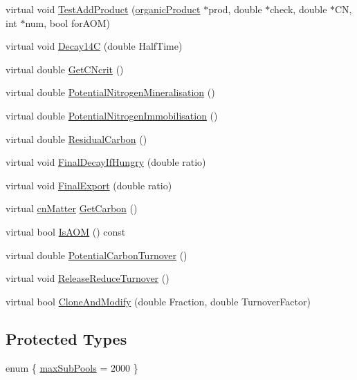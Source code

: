 \begin{DoxyCompactItemize}
virtual void \hyperlink{classadded_matter_a3627f9e81c355df213e783f1ba4a53b2}{TestAddProduct} (\hyperlink{classorganic_product}{organicProduct} $\ast$prod, double $\ast$check, double $\ast$CN, int $\ast$num, bool forAOM)
\item 
virtual void \hyperlink{classadded_matter_ac3f88e4d8ae94d0b7f0fe1b06e33d345}{Decay14C} (double HalfTime)
\item 
virtual double \hyperlink{classadded_matter_ac2d053d776783effa120e93de55c41ea}{GetCNcrit} ()
\item 
virtual double \hyperlink{classadded_matter_a972a4d0ee6fbd8ca8c48be2162c85646}{PotentialNitrogenMineralisation} ()
\item 
virtual double \hyperlink{classadded_matter_a68f5728f82221029360bb31ba2fc1673}{PotentialNitrogenImmobilisation} ()
\item 
virtual double \hyperlink{classadded_matter_a17298527be7046b6035a163e1f558f84}{ResidualCarbon} ()
\item 
virtual void \hyperlink{classadded_matter_a40c4a27c09387b87f804e1c3a48cf908}{FinalDecayIfHungry} (double ratio)
\item 
virtual void \hyperlink{classadded_matter_a6c6bab5a53ecb7358459d44d29681c95}{FinalExport} (double ratio)
\item 
virtual \hyperlink{classcn_matter}{cnMatter} \hyperlink{classadded_matter_aa0c64a25840e1a117b686bb779403147}{GetCarbon} ()
\item 
virtual bool \hyperlink{classadded_matter_a124a49cad0765fff9147d7cb3e3f768e}{IsAOM} () const 
\item 
virtual double \hyperlink{classadded_matter_ac3cf951aba3e5001b9e7d582084863bf}{PotentialCarbonTurnover} ()
\item 
virtual void \hyperlink{classadded_matter_a899b9d029676aa6711339be2479b29d3}{ReleaseReduceTurnover} ()
\item 
virtual bool \hyperlink{classadded_matter_a8032c019960cff02dc5cb38ef2c2614e}{CloneAndModify} (double Fraction, double TurnoverFactor)
\end{DoxyCompactItemize}
\subsection*{Protected Types}
\begin{DoxyCompactItemize}
\item 
enum \{ \hyperlink{classadded_matter_a619ab88288a9bb86a0595a534b2c05d1a804febe24c08f1e5e886ad2112530242}{maxSubPools} = 2000
 \}
\end{DoxyCompactItemize}
